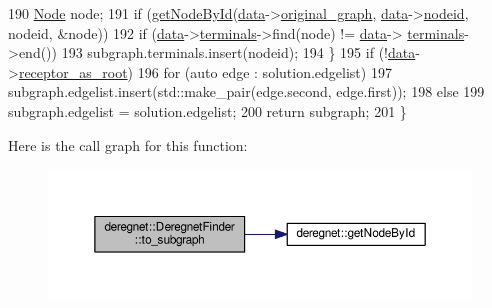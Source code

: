 \begin{DoxyCode}
190             \hyperlink{namespacederegnet_a744bad34f2de9856d36715a445f027f3}{Node} node;
191             \textcolor{keywordflow}{if} (\hyperlink{namespacederegnet_afefc9088a0ea47e8d8c1225b5de29244}{getNodeById}(\hyperlink{classderegnet_1_1DeregnetFinder_ab158f2a6bb7f39ed3d6e4a9ffe568232}{data}->\hyperlink{classderegnet_1_1DeregnetData_a3ea2abe9900785d80fa0141afdd985a9}{original\_graph}, 
      \hyperlink{classderegnet_1_1DeregnetFinder_ab158f2a6bb7f39ed3d6e4a9ffe568232}{data}->\hyperlink{classderegnet_1_1DeregnetData_a3b57d7ed19c104c7fe257e17f0d2cfb5}{nodeid}, nodeid, &node))
192                 \textcolor{keywordflow}{if} (\hyperlink{classderegnet_1_1DeregnetFinder_ab158f2a6bb7f39ed3d6e4a9ffe568232}{data}->\hyperlink{classderegnet_1_1DeregnetData_a1fe559c6056cd411647f836849e4b0da}{terminals}->find(node) != \hyperlink{classderegnet_1_1DeregnetFinder_ab158f2a6bb7f39ed3d6e4a9ffe568232}{data}->
      \hyperlink{classderegnet_1_1DeregnetData_a1fe559c6056cd411647f836849e4b0da}{terminals}->end())
193                     subgraph.terminals.insert(nodeid);
194         \}
195     \textcolor{keywordflow}{if} (!\hyperlink{classderegnet_1_1DeregnetFinder_ab158f2a6bb7f39ed3d6e4a9ffe568232}{data}->\hyperlink{classderegnet_1_1DeregnetData_ae7936fe59661a68464134b9251303727}{receptor\_as\_root})
196         \textcolor{keywordflow}{for} (\textcolor{keyword}{auto} edge : solution.edgelist)
197             subgraph.edgelist.insert(std::make\_pair(edge.second, edge.first));
198     \textcolor{keywordflow}{else}
199         subgraph.edgelist = solution.edgelist;
200     \textcolor{keywordflow}{return} subgraph;
201 \}
\end{DoxyCode}


Here is the call graph for this function\+:
\nopagebreak
\begin{figure}[H]
\begin{center}
\leavevmode
\includegraphics[width=350pt]{classderegnet_1_1DeregnetFinder_a681d5e2506f9b6075ab36e742a360328_cgraph}
\end{center}
\end{figure}




